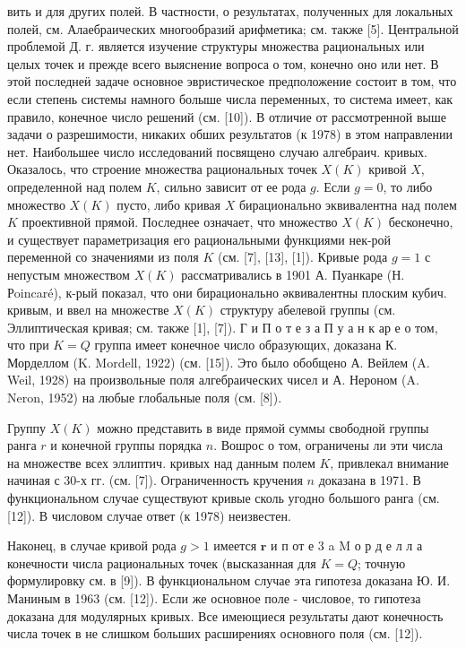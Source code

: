 \documentclass[10pt]{article}
\begin{document}
вить и для других полей. В частности, о результатах, полученных для локальных полей, см. Алаебраических многообразий арифметика; см. также [5]. Центральной проблемой Д. г. является изучение структуры множества рациональных или целых точек и прежде всего выяснение вопроса о том, конечно оно или нет. В этой последнеӥ задаче основное эвристическое предположение состоит в том, что если степень системы намного болыше числа переменных, то система имеет, как правило, конечное число решений (см. [10]). В отличие от рассмотренной выше задачи о разрешимости, никаких обших результатов (к 1978) в этом направлении нет. Наибольшее число исследований посвящено случаю алгебраич. кривых. Оказалось, что строение множества рациональных точек $X(K)$ кривой $X$, определенной над полем $K$, сильно зависит от ее рода $g$. Если $g=0$, то либо множество $X(K)$ пусто, либо кривая $X$ бирационально эквивалентна над полем $K$ проективной прямой. Последнее означает, что множество $X(K)$ бесконечно, и существует параметризация его рациональными функциями нек-рой переменной со значениями из поля $K$ (см. [7], [13], [1]). Кривые рода $g=1$ с непустым множеством $X(K)$ рассматривались в 1901 А. Пуанкаре (Н. Рoincaré), к-рый показал, что они бирационально әквивалентны плоским кубич. кривым, и ввел на множестве $X(K)$ структуру абелевой группы (см. Эллиптическая кривая; см. также [1], [7]). Г и П о т е з а П у а н к ар е о том, что при $K=Q$ группа имеет конечное число образующих, доказана К. Морделлом (K. Mordell, 1922) (см. [15]). Это было обобщено А. Вейлем (A. Weil, 1928) на произвольные поля алгебраических чисел и А. Нероном (A. Neron, 1952) на любые глобальные поля (см. [8]).



Группу $X(K)$ можно представить в виде прямой суммы свободной группы ранга $r$ и конечной группы порядка $n$. Вошрос о том, ограничены ли эти числа на множестве всех эллиптич. кривых над данным полем $K$, привлекал внимание начиная с 30-х гг. (см. [7]). Ограниченность кручения $n$ доказана в 1971. В функциональном случае существуют кривые сколь угодно большого ранга (см. [12]). В числовом случае ответ (к 1978) неизвестен.



Наконец, в случае кривой рода $g>1$ имеется $\mathbf{r}$ и п от е 3 a $\mathrm{M}$ о р д е л л а конечности числа рациональных точек (высказанная для $K=Q$; точную формулировку см. в [9]). В функциональном случае эта гипотеза доказана Ю. И. Маниным в 1963 (см. [12]). Если же основное поле - числовое, то гипотеза доказана для модулярных кривых. Все имеющиеся результаты дают конечность числа точек в не слишком больших расширениях основного поля (см. [12]).
\end{document}

